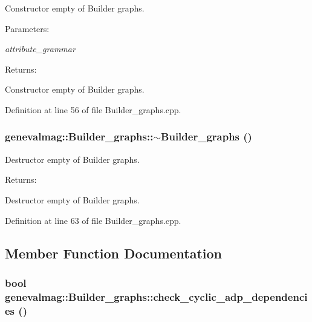 Constructor empty of Builder graphs. \begin{Desc}
\item[Parameters:]
\begin{description}
\item[{\em attribute\_\-grammar}]\end{description}
\end{Desc}
\begin{Desc}
\item[Returns:]\end{Desc}
Constructor empty of Builder graphs. 

Definition at line 56 of file Builder\_\-graphs.cpp.\hypertarget{classgenevalmag_1_1Builder__graphs_1185fa86f07038e594e0292a7d6c5f36}{
\subsubsection[{$\sim$Builder\_\-graphs}]{\setlength{\rightskip}{0pt plus 5cm}genevalmag::Builder\_\-graphs::$\sim$Builder\_\-graphs ()}}
\label{classgenevalmag_1_1Builder__graphs_1185fa86f07038e594e0292a7d6c5f36}


Destructor empty of Builder graphs. \begin{Desc}
\item[Returns:]\end{Desc}
Destructor empty of Builder graphs. 

Definition at line 63 of file Builder\_\-graphs.cpp.

\subsection{Member Function Documentation}
\hypertarget{classgenevalmag_1_1Builder__graphs_278e4c659e6fd91e1f3fc8d37a0edea9}{
\subsubsection[{check\_\-cyclic\_\-adp\_\-dependencies}]{\setlength{\rightskip}{0pt plus 5cm}bool genevalmag::Builder\_\-graphs::check\_\-cyclic\_\-adp\_\-dependencies ()}}
\label{classgenevalmag_1_1Builder__graphs_278e4c659e6fd91e1f3fc8d37a0edea9}


